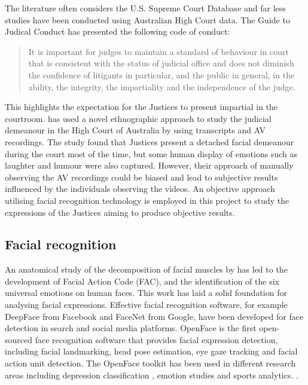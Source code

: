 \documentclass{monashthesis}
\begin{document}
The literature often considers the U.S. Supreme Court Database and far less studies have been conducted using Australian High Court data. The Guide to Judical Conduct \autocite{judicalguid} has presented the following code of conduct:

\begin{quote}
It is important for judges to maintain a standard of behaviour in court that is consistent with the status of judicial office and does not diminish the confidence of litigants in particular, and the public in general, in the ability, the integrity, the impartiality and the independence of the judge.
\end{quote}

This highlights the expectation for the Justices to present impartial in the courtroom. \textcite{tutton2018judicial} has used a novel ethnographic approach to study the judicial demeanour in the High Court of Australia by using transcripts and AV recordings. The study found that Justices present a detached facial demeanour during the court most of the time, but some human display of emotions such as laughter and humour were also captured. However, their approach of manually observing the AV recordings could be biased and lead to subjective results influenced by the individuals observing the videos. An objective approach utilising facial recognition technology is employed in this project to study the expressions of the Justices aiming to produce objective results.

\hypertarget{facial-recognition}{%
\subsection{Facial recognition}\label{facial-recognition}}

An anatomical study of the decomposition of facial muscles by \textcite{ekman1976measuring} has led to the development of Facial Action Code (FAC), and the identification of the six universal emotions on human faces. This work has laid a solid foundation for analysing facial expressions. Effective facial recognition software, for example DeepFace \autocite{taigman2014deepface} from Facebook and FaceNet \autocite{schroff2015facenet} from Google, have been developed for face detection in search and social media platforms. OpenFace \autocite{baltrusaitis2018openface} is the first open-sourced face recognition software that provides facial expression detection, including facial landmarking, head pose estimation, eye gaze tracking and facial action unit detection. The OpenFace toolkit has been used in different research areas including depression classification \autocite{yang2016decision}, emotion studies \autocite{huber2018emotional} and sports analytics. \autocite{kovalchik2018going}.
\end{document}
